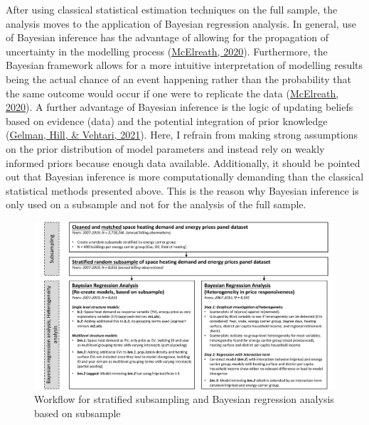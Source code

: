 \documentclass[12pt,twoside]{reedthesis}
\begin{document}
After using classical statistical estimation techniques on the full sample, the analysis moves to the application of Bayesian regression analysis. In general, use of Bayesian inference has the advantage of allowing for the propagation of uncertainty in the modelling process (\protect\hyperlink{ref-mcelreath20}{McElreath, 2020}). Furthermore, the Bayesian framework allows for a more intuitive interpretation of modelling results being the actual chance of an event happening rather than the probability that the same outcome would occur if one were to replicate the data (\protect\hyperlink{ref-mcelreath20}{McElreath, 2020}). A further advantage of Bayesian inference is the logic of updating beliefs based on evidence (data) and the potential integration of prior knowledge (\protect\hyperlink{ref-gelman_etal21}{Gelman, Hill, \& Vehtari, 2021}). Here, I refrain from making strong assumptions on the prior distribution of model parameters and instead rely on weakly informed priors because enough data available. Additionally, it should be pointed out that Bayesian inference is more computationally demanding than the classical statistical methods presented above. This is the reason why Bayesian inference is only used on a subsample and not for the analysis of the full sample.
\begin{figure}

{\centering \includegraphics[width=1.03\linewidth]{figure/workflow_diagramm_part2} 

}

\caption{Workflow for stratified subsampling and Bayesian regression analysis based on subsample}\label{fig:workflow2}
\end{figure}
\end{document}
